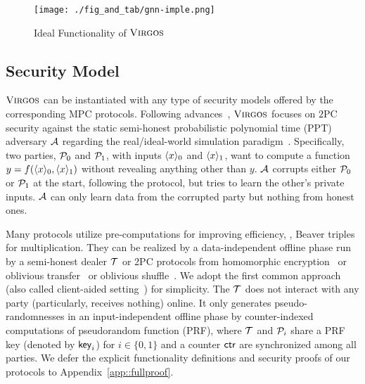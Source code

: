 \begin{figure}[!t]
	\centering
	\texttt{[image: ./fig\_and\_tab/gnn-imple.png]}
	\caption{Ideal Functionality of $\cgnn$}
	\label{graph_imple}
\end{figure}

\subsection{Security Model}
$\cgnn$ can be instantiated with any type of security models offered by the corresponding MPC protocols.
Following advances~\cite{ccs/AttrapadungH0MO21,neurips/crypten2020,sp21/TanKTW,uss/WatsonWP22,ccs/ZouLSLXX24,ccs/KotiKPG24}, $\cgnn$ focuses on $2$PC security against the static semi-honest probabilistic polynomial time (PPT) adversary $\A$ regarding the real/ideal-world simulation paradigm~\cite{sp/17/Lindell17}.
Specifically, two parties, $\pp_0$ and $\pp_1$, with inputs $\l x\r_0$ and $\l x\r_1$, want to compute a function $y = f(\l x\r_0, \l x\r_1)$ without revealing anything other than $y$.
$\A$ corrupts either $\pp_0$ or $\pp_1$ at the start, following the protocol, but tries to learn the other's private inputs.
$\A$ can only learn data from the corrupted party but nothing from  honest ones.

Many protocols utilize pre-computations for improving efficiency, \eg, Beaver triples~\cite{crypto/Beaver91a} for multiplication.
They can be realized by a data-independent offline phase run by a  semi-honest dealer $\tt$ or 2PC protocols from homomorphic encryption~\cite{eurocrypt/LyubashevskyPR10} or oblivious transfer~\cite{pkc/Tzeng02,ccs/KellerOS16} or oblivious shuffle~\cite{asiacrypt/ChaseGP20,ndss/SongYBDC23}.
We adopt the first common approach (also called client-aided setting~\cite{ccs/AttrapadungH0MO21}) for simplicity.
The $\tt$ does not interact with any party (particularly, receives nothing) online.
It only generates pseudo-randomnesses in an input-independent offline phase by counter-indexed computations of pseudorandom function (PRF), where $\tt$ and $\pp_i$ share a PRF key (denoted by $\key_i$) for $i \in \{0,1\}$ and a counter $\ctr$ are synchronized among all parties.
We defer the explicit functionality definitions and security proofs of our protocols to Appendix~\ref{app::fullproof}.
 

